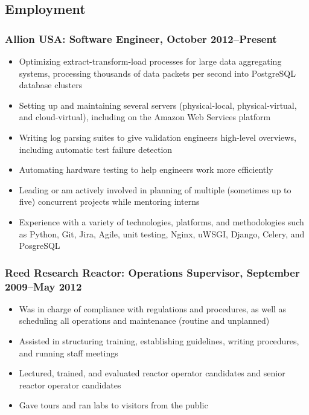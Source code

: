 \documentclass[letterpaper]{article}
\begin{document}
\subsection*{Employment}%


\subsubsection*{Allion USA: \textbf{Software Engineer}, October 2012--Present}
	\begin{itemize}
        \item Optimizing extract-transform-load processes for large data aggregating systems, processing thousands of data packets per second into PostgreSQL database clusters
        \item Setting up and maintaining several servers (physical-local, physical-virtual, and cloud-virtual), including on the Amazon Web Services platform%
        \item Writing log parsing suites to give validation engineers high-level overviews, including automatic test failure detection
        \item Automating hardware testing to help engineers work more efficiently 
        \item Leading or am actively involved in planning of multiple (sometimes up to five) concurrent projects while mentoring interns
        \item Experience with a variety of technologies, platforms, and methodologies such as Python, Git, Jira, Agile, unit testing, Nginx, uWSGI, Django, Celery, and PosgreSQL 
	\end{itemize}
\subsubsection*{Reed Research Reactor: \textbf{Operations Supervisor}, September 2009--May 2012}
	\begin{itemize}
	   \item Was in charge of compliance with regulations and procedures, as well as scheduling all operations and maintenance (routine and unplanned)
	   \item Assisted in structuring training, establishing guidelines, writing procedures, and running staff meetings
	   \item Lectured, trained, and evaluated reactor operator candidates and senior reactor operator candidates
	   \item Gave tours and ran labs to visitors from the public
	\end{itemize}
\end{document}
